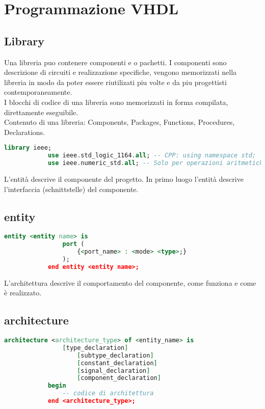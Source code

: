 \section{Programmazione VHDL}
    \subsection{Library}
        Una libreria puo contenere componenti e o pachetti. I componenti sono descrizione di circuiti e realizzazione specifiche,
        vengono memorizzati nella libreria in modo da poter essere riutilizati piu volte e da piu progettisti contemporaneamente.\\
        I blocchi di codice di una libreria sono memorizzati in forma compilata, direttamente eseguibile.\\
        Contenuto di una libreria: Components, Packages, Functions, Procedures, Declarations.
        \begin{lstlisting}[language=VHDL]
            library ieee; 
            use ieee.std_logic_1164.all; -- CPP: using namespace std;
            use ieee.numeric_std.all; -- Solo per operazioni aritmetiche per vettori
        \end{lstlisting}


    L'entità descrive il componente del progetto.
    In primo luogo l'entità descrive l'interfaccia (schnittstelle) del componente.
    \subsection{entity}
        \begin{lstlisting}[language=VHDL]
            entity <entity name> is
                port (
                    {<port_name> : <mode> <type>;}
                );
            end entity <entity name>;
        \end{lstlisting}

    L'architettura descrive il comportamento del componente, come funziona e come è realizzato.
    \subsection{architecture}
        \begin{lstlisting}[language=VHDL, numberstyle=\tiny\color{gray}\highlightlines{1,7,8,9}{green}]
            architecture <architecture_type> of <entity_name> is
                [type_declaration]
                    [subtype_declaration]
                    [constant_declaration]
                    [signal_declaration]
                    [component_declaration]
            begin
                -- codice di architettura
            end <architecture_type>;
        \end{lstlisting}

